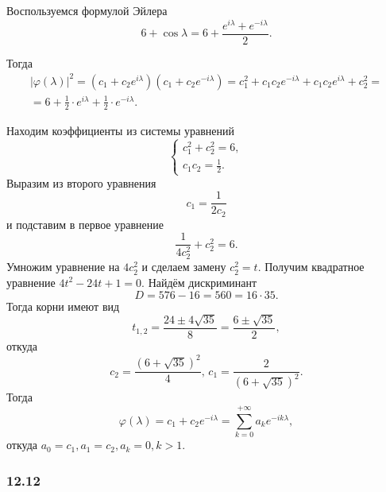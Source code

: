 Воспользуемся формулой Эйлера
\begin{equation*}
  6 + \cos \lambda =
  6 + \frac{e^{i \lambda } + e^{-i \lambda }}{2}.
\end{equation*}

Тогда
\begin{gather*}
  \left| \varphi \left( \lambda \right) \right|^2 =
  \left( c_1 + c_2 e^{i \lambda} \right) \left( c_1 + c_2 e^{-i \lambda } \right) =
  c_1^2 + c_1 c_2 e^{-i \lambda } + c_1 c_2 e^{i \lambda } + c_2^2 = \\
  = 6 + \frac{1}{2} \cdot e^{i \lambda } + \frac{1}{2} \cdot e^{-i \lambda }.
\end{gather*}

Находим коэффициенты из системы уравнений
\begin{equation*}
  \begin{cases}
    c_1^2 + c_2^2 = 6, \\
    c_1 c_2 = \frac{1}{2}.
  \end{cases}
\end{equation*}
Выразим из второго уравнения
\begin{equation*}
  c_1 =
  \frac{1}{2c_2}
\end{equation*}
и подставим в первое уравнение
\begin{equation*}
  \frac{1}{4c_2^2} + c_2^2 = 6.
\end{equation*}
Умножим уравнение на $4c_2^2$ и сделаем замену $c_2^2 = t$.
Получим квадратное уравнение $4t^2 - 24t + 1 = 0$.
Найдём дискриминант
\begin{equation*}
  D =
  576 - 16 = 560 = 16 \cdot 35.
\end{equation*}
Тогда корни имеют вид
\begin{equation*}
  t_{1, 2} =
  \frac{24 \pm 4 \sqrt{35}}{8} =
  \frac{6 \pm \sqrt{35}}{2},
\end{equation*}
откуда
\begin{equation*}
  c_2 = \frac{ \left( 6 + \sqrt{35} \right)^2}{4}, \,
  c_1 = \frac{2}{ \left( 6 + \sqrt{35} \right)^2}.
\end{equation*}
Тогда
\begin{equation*}
  \varphi \left( \lambda \right) =
  c_1 + c_2 e^{-i \lambda } =
  \sum \limits_{k = 0}^{+\infty } a_k e^{-ik \lambda },
\end{equation*}
откуда $a_0 = c_1, a_1 = c_2, a_k = 0, k > 1$.

\subsubsection*{12.12}


